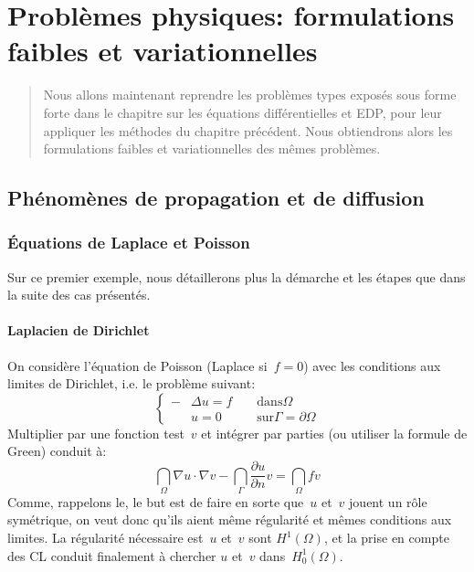 \chapter{Problèmes physiques: formulations faibles et variationnelles}
\begin{abstract}
Nous allons maintenant reprendre les problèmes types exposés sous forme
forte dans le chapitre sur les équations différentielles et EDP, pour leur appliquer les méthodes
du chapitre précédent.
Nous obtiendrons alors les formulations faibles et variationnelles des mêmes problèmes.
%
\end{abstract}

\medskip
\section{Phénomènes de propagation et de diffusion}
\medskip
\subsection{Équations de Laplace et Poisson}

Sur ce premier exemple, nous détaillerons plus la démarche et les étapes que dans
la suite des cas présentés.

\medskip
\subsubsection{Laplacien de Dirichlet}
On considère l'équation de Poisson (Laplace si~$f=0$) avec les conditions aux limites de Dirichlet,
i.e. le problème suivant:
\begin{equation}\left\{\begin{aligned}
-&\Delta u=f &&\text{ dans} \Omega\\
&u=0 &&\text{ sur} \Gamma=\partial\Omega
\end{aligned}
\right.
\end{equation}
Multiplier par une fonction test~$v$ et intégrer par parties (ou utiliser la formule de Green) conduit à:
\begin{equation}
\dint_\Omega \nabla u\cdot\nabla v -\dint_\Gamma \dfrac{\partial u}{\partial n}v =
\dint_\Omega fv
\end{equation}
Comme, rappelons le, le but est de faire en sorte que~$u$ et~$v$ jouent un
rôle symétrique, on veut donc qu'ils aient même régularité et mêmes
conditions aux limites. La régularité nécessaire est~$u$ et~$v$ sont
$H^1(\Omega)$, et la prise en compte des CL conduit finalement à chercher
$u$ et~$v$ dans~$H^1_0(\Omega)$.

